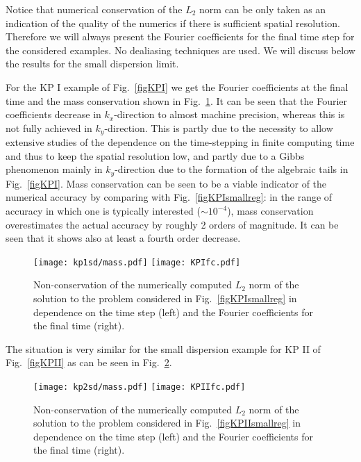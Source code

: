 \documentclass[final]{siamltex}
\begin{document}
Notice that numerical conservation of the $L_{2}$ norm can be only 
taken as an indication of the quality of the numerics if there is 
sufficient spatial resolution. Therefore we will always present the 
Fourier coefficients for the final time step for the considered 
examples. No dealiasing techniques are used.
We will discuss below the results for the small dispersion 
limit. 

For the KP I example of Fig.~\ref{figKPI} we get the Fourier 
coefficients at the final time and the mass conservation shown in 
Fig.~\ref{figKPIsmallmass}. It can be seen that the Fourier 
coefficients decrease in $k_{x}$-direction to almost machine 
precision, whereas this is not fully achieved in $k_{y}$-direction. 
This is partly due to the necessity to allow extensive studies of the 
dependence on the time-stepping in finite computing time and thus to 
keep the spatial resolution low, and partly due 
to a Gibbs phenomenon mainly in $k_{y}$-direction due to the formation of the 
algebraic tails in Fig.~\ref{figKPI}. Mass conservation can be seen to 
be a viable indicator of the numerical accuracy by comparing with 
Fig.~\ref{figKPIsmallreg}: in the range of accuracy in which one is 
typically interested ($\sim10^{-4}$), mass conservation overestimates the actual 
accuracy by roughly 2 orders of magnitude. It can be seen that it 
shows also at least a fourth order decrease. 
\begin{figure}[htb!]
    \texttt{[image: kp1sd/mass.pdf]}
 \texttt{[image: KPIfc.pdf]}
 \caption{Non-conservation of the numerically computed $L_{2}$ norm 
 of the solution to the problem considered in Fig.~\ref{figKPIsmallreg} 
 in dependence on the time step
(left) and the Fourier coefficients for the final time 
 (right). }
   \label{figKPIsmallmass}
\end{figure}

The situation is very similar for the small dispersion example for KP II 
of Fig.~\ref{figKPII} as can be seen in Fig.~\ref{figKPIIsmallmass}.
\begin{figure}[htb!]
 \texttt{[image: kp2sd/mass.pdf]}
 \texttt{[image: KPIIfc.pdf]}
 \caption{Non-conservation of the numerically computed $L_{2}$ norm 
 of the solution to the problem considered in 
 Fig.~\ref{figKPIIsmallreg} 
 in dependence on the time step
 (left) and the Fourier coefficients for the final time 
  (right). }
    \label{figKPIIsmallmass}
\end{figure}
\end{document}
